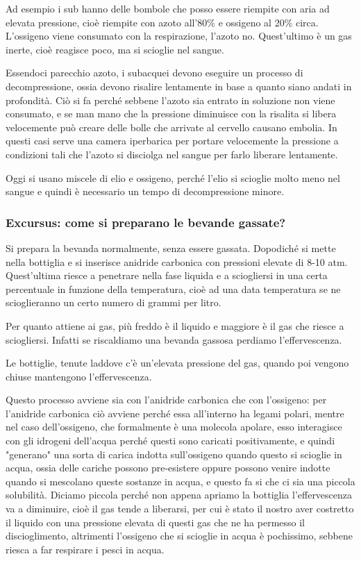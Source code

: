 \vspace{0.2cm}Ad esempio i sub hanno delle bombole che posso essere riempite con aria ad elevata pressione, cioè riempite con azoto all'80\% e ossigeno al 20\% circa. L'ossigeno viene consumato con la respirazione, l'azoto no. Quest'ultimo è un gas inerte, cioè reagisce poco, ma si scioglie nel sangue.

Essendoci parecchio azoto, i subacquei devono eseguire un processo di decompressione, ossia devono risalire lentamente in base a quanto siano andati in profondità. Ciò si fa perché sebbene l'azoto sia entrato in soluzione non viene consumato, e se man mano che la pressione diminuisce con la risalita si libera velocemente può creare delle bolle che arrivate al cervello causano embolia. In questi casi serve una camera iperbarica per portare velocemente la pressione a condizioni tali che l'azoto si disciolga nel sangue per farlo liberare lentamente.

Oggi si usano miscele di elio e ossigeno, perché l'elio si scioglie molto meno nel sangue e quindi è necessario un tempo di decompressione minore.

\subsubsection{Excursus: come si preparano le bevande gassate?}

Si prepara la bevanda normalmente, senza essere gassata. Dopodiché si mette nella bottiglia e si inserisce anidride carbonica con pressioni elevate di 8-10 atm. Quest'ultima riesce a penetrare nella fase liquida e a sciogliersi in una certa percentuale in funzione della temperatura, cioè ad una data temperatura se ne scioglieranno un certo numero di grammi per litro. 

Per quanto attiene ai gas, più freddo è il liquido e maggiore è il gas che riesce a sciogliersi. Infatti se riscaldiamo una bevanda gassosa perdiamo l'effervescenza.

Le bottiglie, tenute laddove c'è un'elevata pressione del gas, quando poi vengono chiuse mantengono l'effervescenza.

Questo processo avviene sia con l'anidride carbonica che con l'ossigeno: per l'anidride carbonica ciò avviene perché essa all'interno ha legami polari, mentre nel caso dell'ossigeno, che formalmente è una molecola apolare, esso interagisce con gli idrogeni dell'acqua perché questi sono caricati positivamente, e quindi "generano" una sorta di carica indotta sull'ossigeno quando questo si scioglie in acqua, ossia delle cariche possono pre-esistere oppure possono venire indotte quando si mescolano queste sostanze in acqua, e questo fa si che ci sia una piccola solubilità. Diciamo piccola perché non appena apriamo la bottiglia l'effervescenza va a diminuire, cioè il gas tende a liberarsi, per cui è stato il nostro aver costretto il liquido con una pressione elevata di questi gas che ne ha permesso il discioglimento, altrimenti l'ossigeno che si scioglie in acqua è pochissimo, sebbene riesca a far respirare i pesci in acqua.

